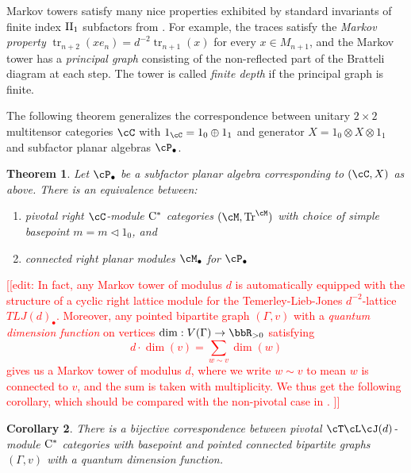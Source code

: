 \documentclass[11pt]{article}
\theoremstyle{plain}
\newtheorem{thmalpha}{Theorem}
\newtheorem{coralpha}[thmalpha]{Corollary}
\theoremstyle{definition}
\DeclareMathOperator{\Tr}{Tr}
\DeclareMathOperator{\tr}{tr}
\newcommand{\Cstar}{\rm{C^*}}
\newcommand{\nn}[1]{\textcolor{red}{[[#1]]}}
\begin{document}
Markov towers satisfy many nice properties exhibited by standard invariants of finite index ${\rm II}_1$ subfactors from \cite[Ch.~4]{MR999799}.
For example, the traces satisfy the \emph{Markov property} $\tr_{n+2}(x e_n) = d^{-2}\tr_{n+1}(x)$ for every $x\in M_{n+1}$, and the Markov tower has a \emph{principal graph} consisting of the non-reflected part of the Bratteli diagram at each step.
The tower is called \emph{finite depth} if the principal graph is finite.

The following theorem generalizes the correspondence between
unitary $2\times 2$ multitensor categories $\cC$ with $1_\cC =1_0\oplus 1_1$ and generator $X = 1_0\otimes X \otimes 1_1$ 
and
subfactor planar algebras $\cP_\bullet$.

\begin{thmalpha}
\label{thm:ModuleEquivalence}
Let $\cP_\bullet$ be a subfactor planar algebra corresponding to $(\cC, X)$ as above.
There is an equivalence between:
\begin{enumerate}[label={\rm(\arabic*)}]
\item
pivotal right $\cC$-module $\Cstar$ categories $(\cM,\Tr^\cM)$ with choice of simple basepoint $m = m\vartriangleleft 1_0$, and
\item
connected right planar modules $\cM_\bullet$ for $\cP_\bullet$
\end{enumerate}
\end{thmalpha}

\nn{edit:
In fact, any Markov tower of modulus $d$
 is automatically equipped with the structure of a cyclic right lattice module for 
the Temerley-Lieb-Jones $d^{-2}$-lattice $TLJ(d)_\bullet$.
Moreover, any pointed bipartite graph $(\Gamma,v)$ with a \emph{quantum dimension function} on vertices $\dim: V(\Gamma) \to \bbR_{>0}$ satisfying
$$
d\cdot \dim(v) = \sum_{w\sim v} \dim(w)
$$
gives us a Markov tower of modulus $d$, where we write $w\sim v$ to mean $w$ is connected to $v$, and the sum is taken with multiplicity.
We thus get the following corollary, which should be compared with the non-pivotal case in \cite{MR3420332}.
}

\begin{coralpha}
\label{cor:TLJPivotalModuleClassification}
There is a bijective correspondence between
pivotal $\cT\cL\cJ(d)$-module $\Cstar$ categories with basepoint and 
pointed connected bipartite graphs $(\Gamma, v)$ with a quantum dimension function.
\end{coralpha}
\end{document}
